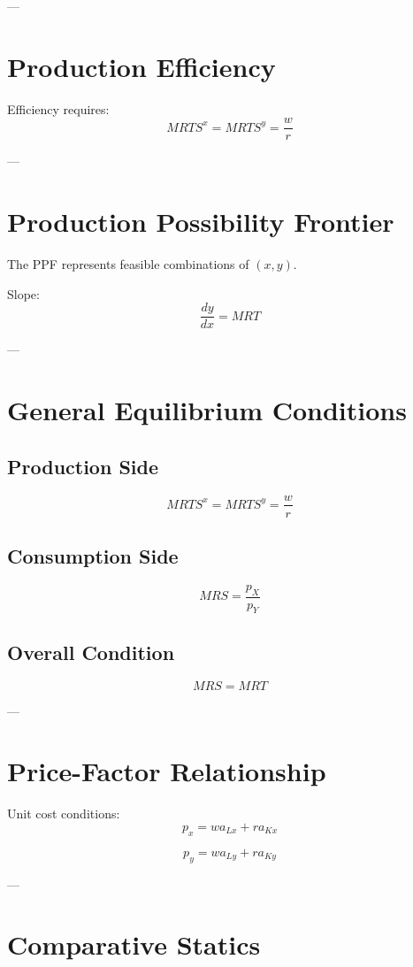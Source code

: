 ---

\section{Production Efficiency}

Efficiency requires:
\[
MRTS^x = MRTS^y = \frac{w}{r}
\]

---

\section{Production Possibility Frontier}

The PPF represents feasible combinations of $(x,y)$.

Slope:
\[
\frac{dy}{dx} = MRT
\]

---

\section{General Equilibrium Conditions}

\subsection{Production Side}
\[
MRTS^x = MRTS^y = \frac{w}{r}
\]

\subsection{Consumption Side}
\[
MRS = \frac{p_X}{p_Y}
\]

\subsection{Overall Condition}
\[
MRS = MRT
\]

---

\section{Price-Factor Relationship}

Unit cost conditions:
\[
p_x = w a_{Lx} + r a_{Kx}
\]

\[
p_y = w a_{Ly} + r a_{Ky}
\]

---

\section{Comparative Statics}

